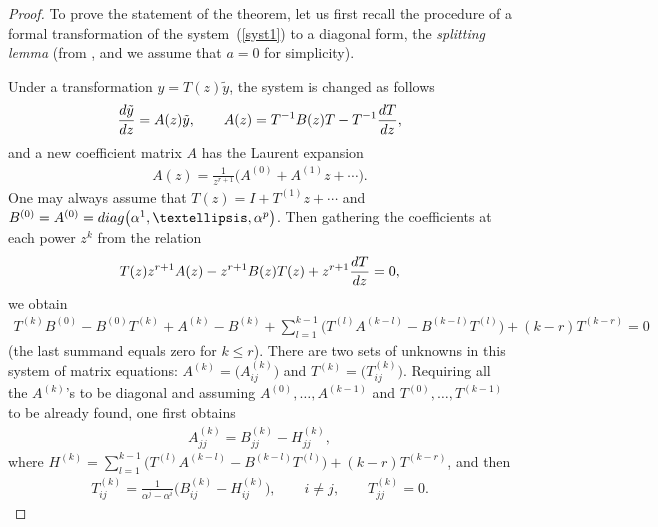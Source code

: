 \documentclass[11pt]{article}
\numberwithin{equation}{section}
\begin{document}
\begin{proof} To prove the statement of the theorem, let us first recall the procedure of a formal transformation of the
system~(\ref{syst1}) to a diagonal form, the {\it splitting lemma} (from \cite[Section~11]{Wa}, and we assume that $a=0$ for simplicity).

Under a transformation $y=T(z)\tilde y$, the system is changed as follows
\begin{gather*}
\frac{{\rm d}\tilde y}{{\rm d}z}=A(z) \tilde y, \qquad A(z)=T^{-1}B(z)T-T^{-1}\frac{{\rm d}T}{{\rm d}z},
\end{gather*}
and a new coefficient matrix $A$ has the Laurent expansion
\begin{gather*}
A(z)=\frac1{z^{r+1}}\bigl(A^{(0)}+A^{(1)}z+\cdots\bigr).
\end{gather*}
One may always assume that $T(z)=I+T^{(1)}z+\cdots$ and $B^{(0)}=A^{(0)}={\rm diag}\big(\alpha^1,\ldots,\alpha^p\big)$. Then gathering the coefficients at each power $z^k$ from the relation
\begin{gather*}
T(z) z^{r+1}A(z)-z^{r+1}B(z) T(z)+z^{r+1}\frac{{\rm d}T}{{\rm d}z}=0,
\end{gather*}
we obtain
\begin{gather*}
T^{(k)}B^{(0)}-B^{(0)}T^{(k)}+A^{(k)}-B^{(k)}+\sum_{l=1}^{k-1}\big(T^{(l)}A^{(k-l)}-B^{(k-l)}T^{(l)}\big)+(k-r)T^{(k-r)}=0
\end{gather*}
(the last summand equals zero for $k\leqslant r$). There are two sets of unknowns in this system of matrix equations:
$A^{(k)}=\big(A^{(k)}_{ij}\big)$ and $T^{(k)}=\big(T^{(k)}_{ij}\big)$. Requiring all the $A^{(k)}$'s to be diagonal and assuming
$A^{(0)},\ldots,A^{(k-1)}$ and $T^{(0)},\ldots,T^{(k-1)}$ to be already found, one first obtains
\begin{gather*}
A^{(k)}_{jj}=B^{(k)}_{jj}-H^{(k)}_{jj},
\end{gather*}
where $H^{(k)}=\sum\limits_{l=1}^{k-1}\big(T^{(l)}A^{(k-l)}-B^{(k-l)}T^{(l)}\big)+(k-r)T^{(k-r)}$, and then
\begin{gather*}
T^{(k)}_{ij}=\frac1{\alpha^j-\alpha^i}\bigl(B^{(k)}_{ij}-H^{(k)}_{ij}\bigr),\qquad i\ne j, \qquad T^{(k)}_{jj}=0.
\end{gather*}


\end{proof}
\end{document}
